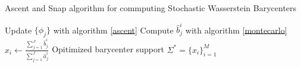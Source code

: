 \begin{algorithm}
    \caption{Ascent and Snap algorithm for commputing Stochastic Wasserstein Barycenters}\label{ascent_snap}
    \begin{algorithmic}[1]
            \STATE Update $\lbrace \phi_j \rbrace$ with algorithm \ref{ascent} 
            \STATE Compute $\hat{b}_j^i$ with algorithm \ref{montecarlo} 
                \STATE $x_i \gets \frac{\sum_{j=1}^J \hat{b}_j^i }{\sum_{j=1}^{J}\hat{a}_j^i}$
            \ENDFOR
        \ENDFOR
        \RETURN Opitimized barycenter support $\Sigma^* = \lbrace x_i \rbrace_{i=1}^M$
    \end{algorithmic}
\end{algorithm}
